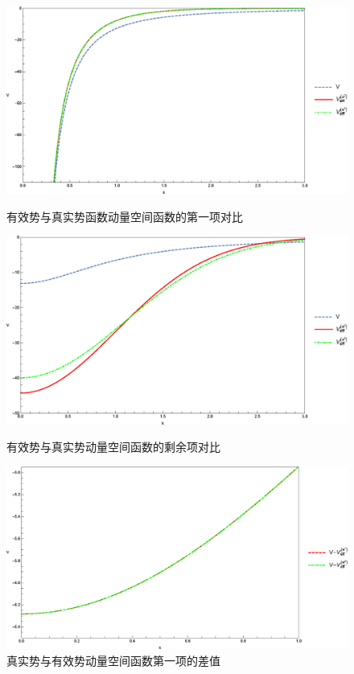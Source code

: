 \documentclass[8pt]{beamer}
\begin{document}
\begin{frame}
\begin{figure}[!bp]
\begin{minipage}[t]{0.45\linewidth}
	\centering
	\includegraphics[width=\textwidth]{FourierTransformation_2.eps}
	\caption{有效势与真实势函数动量空间函数的第一项对比}\label{fourpart1}
\end{minipage}
\begin{minipage}[t]{0.45\linewidth}
	\centering
	\includegraphics[width=\textwidth]{FourierTransformation_3.eps}
	\caption{有效势与真实势动量空间函数的剩余项对比}\label{fourpart2}
\end{minipage}
\begin{minipage}[t]{0.45\linewidth}
\centering
\includegraphics[width=\textwidth]{FourierTransformation_4.eps}
\caption{真实势与有效势动量空间函数第一项的差值}\label{fourminus}
\end{minipage}
\end{figure}
\end{frame}
\end{document}
